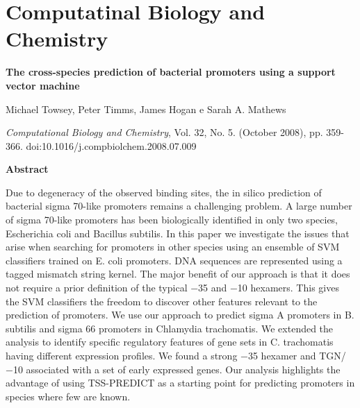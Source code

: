 \chapter{Computatinal Biology and Chemistry}
{\Large \bf The cross-species prediction of bacterial promoters using a support vector machine}

Michael Towsey, Peter Timms, James Hogan e Sarah A. Mathews

{\it Computational Biology and Chemistry}, Vol. 32, No. 5. (October 2008), pp. 359-366. doi:10.1016/j.compbiolchem.2008.07.009

{\large \bf Abstract}

Due to degeneracy of the observed binding sites, the in silico prediction of bacterial sigma 70-like promoters remains a challenging problem. A large number of  sigma 70-like promoters has been biologically identified in only two species, Escherichia coli and Bacillus subtilis. In this paper we investigate the issues that arise when searching for promoters in other species using an ensemble of SVM classifiers trained on E. coli promoters. DNA sequences are represented using a tagged mismatch string kernel. The major benefit of our approach is that it does not require a prior definition of the typical −35 and −10 hexamers. This gives the SVM classifiers the freedom to discover other features relevant to the prediction of promoters. We use our approach to predict sigma A promoters in B. subtilis and sigma 66 promoters in Chlamydia trachomatis. We extended the analysis to identify specific regulatory features of gene sets in C. trachomatis having different expression profiles. We found a strong −35 hexamer and TGN/−10 associated with a set of early expressed genes. Our analysis highlights the advantage of using TSS-PREDICT as a starting point for predicting promoters in species where few are known.